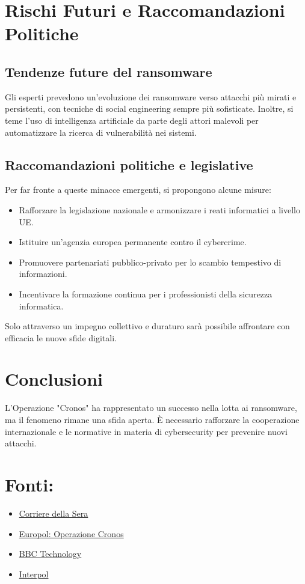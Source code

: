 \documentclass[a4paper,12pt]{article}
\begin{document}
\section{Rischi Futuri e Raccomandazioni Politiche}
\subsection{Tendenze future del ransomware}
Gli esperti prevedono un’evoluzione dei ransomware verso attacchi più mirati e persistenti, con tecniche di social engineering sempre più sofisticate. Inoltre, si teme l’uso di intelligenza artificiale da parte degli attori malevoli per automatizzare la ricerca di vulnerabilità nei sistemi.

\subsection{Raccomandazioni politiche e legislative}
Per far fronte a queste minacce emergenti, si propongono alcune misure:
\begin{itemize}
    \item Rafforzare la legislazione nazionale e armonizzare i reati informatici a livello UE.
    \item Istituire un’agenzia europea permanente contro il cybercrime.
    \item Promuovere partenariati pubblico-privato per lo scambio tempestivo di informazioni.
    \item Incentivare la formazione continua per i professionisti della sicurezza informatica.
\end{itemize}
Solo attraverso un impegno collettivo e duraturo sarà possibile affrontare con efficacia le nuove sfide digitali.

\section{Conclusioni}
L'Operazione "Cronos" ha rappresentato un successo nella lotta ai ransomware, ma il fenomeno rimane una sfida aperta. È necessario rafforzare la cooperazione internazionale e le normative in materia di cybersecurity per prevenire nuovi attacchi.

\newpage
\section{Fonti:}
\begin{itemize}
    \item \href{https://www.corriere.it/tecnologia/23_dicembre_19/chi-sono-i-russi-di-lockbit-hacker-che-hanno-bloccato-la-pubblica-amministrazione-politica-contano-solo-i-soldi-695b2492-8908-4e12-993c-5cb23941dxlk.shtml}{Corriere della Sera}
    \item \href{https://www.europol.europa.eu/media-press/newsroom/news/lockbit-ransomware-group-disrupted-in-international-cyber-police-operation}{Europol: Operazione Cronos}
    \item \href{https://www.bbc.com/news/technology-68322223}{BBC Technology}
    \item \href{https://www.interpol.int/en/News-and-Events/News/2024/Global-Operation-Cronos-strikes-Lockbit}{Interpol}
\end{itemize}
\end{document}
